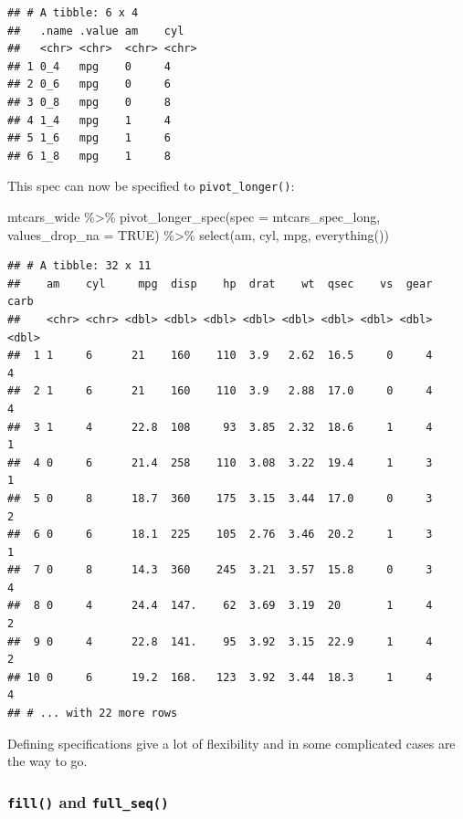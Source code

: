 \documentclass[
]{article}
\newenvironment{Shaded}{\begin{snugshade}}{\end{snugshade}}
\newcommand{\AttributeTok}[1]{\textcolor[rgb]{0.77,0.63,0.00}{#1}}
\newcommand{\ConstantTok}[1]{\textcolor[rgb]{0.00,0.00,0.00}{#1}}
\newcommand{\FunctionTok}[1]{\textcolor[rgb]{0.00,0.00,0.00}{#1}}
\newcommand{\NormalTok}[1]{#1}
\newcommand{\SpecialCharTok}[1]{\textcolor[rgb]{0.00,0.00,0.00}{#1}}
\begin{document}
\begin{verbatim}
## # A tibble: 6 x 4
##   .name .value am    cyl  
##   <chr> <chr>  <chr> <chr>
## 1 0_4   mpg    0     4    
## 2 0_6   mpg    0     6    
## 3 0_8   mpg    0     8    
## 4 1_4   mpg    1     4    
## 5 1_6   mpg    1     6    
## 6 1_8   mpg    1     8
\end{verbatim}

This spec can now be specified to \texttt{pivot\_longer()}:

\begin{Shaded}
\begin{Highlighting}[]
\NormalTok{mtcars\_wide }\SpecialCharTok{\%\textgreater{}\%}
  \FunctionTok{pivot\_longer\_spec}\NormalTok{(}\AttributeTok{spec =}\NormalTok{ mtcars\_spec\_long,}
                    \AttributeTok{values\_drop\_na =} \ConstantTok{TRUE}\NormalTok{) }\SpecialCharTok{\%\textgreater{}\%}
  \FunctionTok{select}\NormalTok{(am, cyl, mpg, }\FunctionTok{everything}\NormalTok{())}
\end{Highlighting}
\end{Shaded}

\begin{verbatim}
## # A tibble: 32 x 11
##    am    cyl     mpg  disp    hp  drat    wt  qsec    vs  gear  carb
##    <chr> <chr> <dbl> <dbl> <dbl> <dbl> <dbl> <dbl> <dbl> <dbl> <dbl>
##  1 1     6      21    160    110  3.9   2.62  16.5     0     4     4
##  2 1     6      21    160    110  3.9   2.88  17.0     0     4     4
##  3 1     4      22.8  108     93  3.85  2.32  18.6     1     4     1
##  4 0     6      21.4  258    110  3.08  3.22  19.4     1     3     1
##  5 0     8      18.7  360    175  3.15  3.44  17.0     0     3     2
##  6 0     6      18.1  225    105  2.76  3.46  20.2     1     3     1
##  7 0     8      14.3  360    245  3.21  3.57  15.8     0     3     4
##  8 0     4      24.4  147.    62  3.69  3.19  20       1     4     2
##  9 0     4      22.8  141.    95  3.92  3.15  22.9     1     4     2
## 10 0     6      19.2  168.   123  3.92  3.44  18.3     1     4     4
## # ... with 22 more rows
\end{verbatim}

Defining specifications give a lot of flexibility and in some complicated cases are the way to go.

\hypertarget{fill-and-full_seq}{%
\subsubsection{\texorpdfstring{\texttt{fill()} and \texttt{full\_seq()}}{fill() and full\_seq()}}\label{fill-and-full_seq}}
\end{document}
